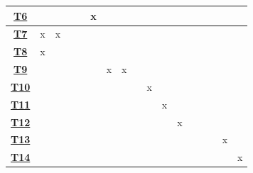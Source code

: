 \documentclass[
    fontsize=12pt,
    headings=small,
    parskip=half,           %
    bibliography=totoc,
    numbers=noenddot,       %
    open=any,               %
    ]{scrreprt}
\begin{document}
\begin{table}[H]
\begin{tabular}{|c|c|c|c|c|c|c|c|c|c|c|c|c|c|c|c|c|}
	\hyperref[threat:T6]{\textbf{T6}}              &             &             &             &             & x           &    &    &    &    &     &     &     &     &     &     &     \\ \hline
	\hyperref[threat:T7]{\textbf{T7}}              & x           & x           &             &             &             &    &    &    &    &     &     &     &     &     &     &     \\ \hline
	\hyperref[threat:T8]{\textbf{T8}}              & x           &             &             &             &             &    &    &    &    &     &     &     &     &     &     &     \\ \hline
	\hyperref[threat:T9]{\textbf{T9}}              &             &             &             &             &             & x  & x  &    &    &     &     &     &     &     &     &     \\ \hline
	\hyperref[threat:T10]{\textbf{T10}}             &             &             &             &             &             &    &    &    & x  &     &     &     &     &     &     &     \\ \hline
	\hyperref[threat:T11]{\textbf{T11}}             &             &             &             &             &             &    &    &    &    & x   &     &     &     &     &     &     \\ \hline
	\hyperref[threat:T12]{\textbf{T12}}             &             &             &             &             &             &    &    &    &    &     & x   &     &     &     &     &     \\ \hline
	\hyperref[threat:T13]{\textbf{T13}}             &             &             &             &             &             &    &    &    &    &     &     &     &     &     & x   &     \\ \hline
	\hyperref[threat:T14]{\textbf{T14}}             &             &             &             &             &             &    &    &    &    &     &     &     &     &     &     & x   \\ \hline
	\end{tabular}
	\end{table}
\end{document}
